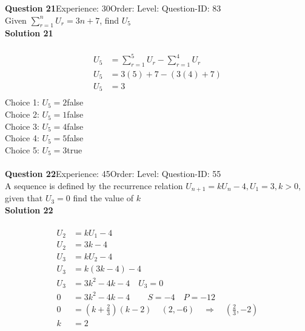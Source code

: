 \documentclass{article}
\begin{document}
\noindent\textbf{Question 21}\hspace{20pt}Experience: 30\hspace{20pt}Order: \hspace{20pt}Level: \hspace{20pt}Question-ID: 83\\[2pt]
Given $\displaystyle\sum_{r=1}^{n} U_r = 3n+7$, find $U_5$\\[4pt]
\noindent\textbf{Solution 21}\\[2pt]
\\[-35pt]\begin{align*}
U_5&=\displaystyle\sum_{r=1}^{5} U_r - \displaystyle\sum_{r=1}^{4} U_r\\[2pt]
U_5&=3(5)+7 - (3(4)+7)\\[2pt]
U_5&=3\\
\end{align*}
Choice 1: \hspace{20pt}$U_5=2$\hspace{20pt}false\\
Choice 2: \hspace{20pt}$U_5=1$\hspace{20pt}false\\
Choice 3: \hspace{20pt}$U_5=4$\hspace{20pt}false\\
Choice 4: \hspace{20pt}$U_5=5$\hspace{20pt}false\\
Choice 5: \hspace{20pt}$U_5=3$\hspace{20pt}true\\
\\[4pt]
\noindent\textbf{Question 22}\hspace{20pt}Experience: 45\hspace{20pt}Order: \hspace{20pt}Level: \hspace{20pt}Question-ID: 55\\[2pt]
A sequence is defined by the recurrence relation $U_{n+1}=kU_n-4, U_1=3, k>0$, given that $U_3=0$ find the value of $k$\\[4pt]
\noindent\textbf{Solution 22}\\[2pt]
\\[-35pt]\begin{align*}
U_2&=kU_1-4\\[2pt]
U_2&=3k-4\\[12pt]
U_3&=kU_2-4\\[2pt]
U_3&=k(3k-4)-4\\[2pt]
U_3&=3k^2-4k-4\quad U_3=0\\[12pt]
0&=3k^2-4k-4\hspace{25pt}S=-4\quad P=-12\\[2pt]
0&=\left(k+\frac{2}{3}\right)(k-2) \hspace{13pt}(2,-6) \quad \Rightarrow \quad \left(\displaystyle\frac{2}{3},-2\right)\\[2pt]
k&=2
\end{align*}
\end{document}
